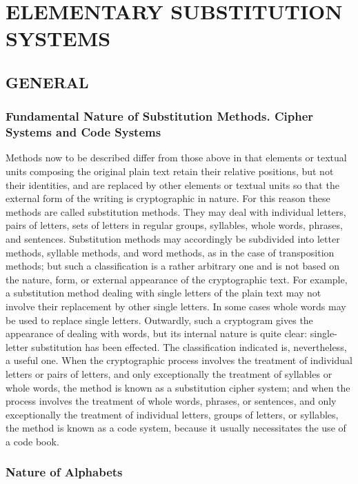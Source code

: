  

 

\chapter{ELEMENTARY SUBSTITUTION SYSTEMS}

\section{GENERAL}

\subsection{Fundamental Nature of Substitution Methods. Cipher Systems and Code Systems}

Methods now to be described differ from those above in that elements
or textual units composing the original plain text retain their relative
positions, but not their identities, and are replaced by other elements or
textual units so that the external form of the writing is cryptographic in
nature. For this reason these methods are called substitution methods.
They may deal with individual letters, pairs of letters, sets of letters in
regular groups, syllables, whole words, phrases, and sentences. Substitution methods may accordingly be subdivided into letter methods, syllable
methods, and word methods, as in the case of transposition methods;
but such a classiﬁcation is a rather arbitrary one and is not based on the
nature, form, or external appearance of the cryptographic text. For
example, a substitution method dealing with single letters of the plain text
may not involve their replacement by other single letters. In some cases
whole words may be used to replace single letters. Outwardly, such a
cryptogram gives the appearance of dealing with words, but its internal
nature is quite clear: single-letter substitution has been effected. The
classiﬁcation indicated is, nevertheless, a useful one. When the cryptographic process involves the treatment of individual letters or pairs of
letters, and only exceptionally the treatment of syllables or whole words,
the method is known as a substitution cipher system; and when the
process involves the treatment of whole words, phrases, or sentences, and
only exceptionally the treatment of individual letters, groups of letters,
or syllables, the method is known as a code system, because it usually
necessitates the use of a code book.

\subsection{Nature of Alphabets}

